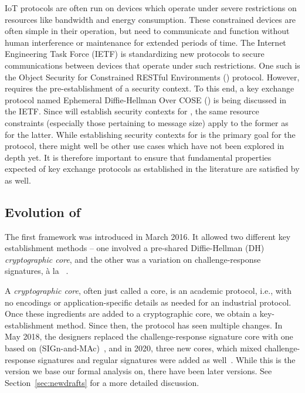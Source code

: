 IoT protocols are often run on devices which operate under severe restrictions
on resources like bandwidth and energy consumption.
%
These constrained devices are often simple in their operation, but need to
communicate and function without human interference or maintenance for
extended periods of time.
%
The Internet Engineering Task Force (IETF) is standardizing new protocols to secure communications between devices that operate under such restrictions.
%
One such is the Object Security for Constrained RESTful Environments
(\mOscore{}) protocol.
%
However, \mOscore{} requires the pre-establishment of a security context.
%
To this end, a key exchange protocol named Ephemeral Diffie-Hellman Over
COSE
(\mEdhoc{}) is being discussed in the IETF.
%
Since \mEdhoc{} will establish security contexts for \mOscore{}, the same
resource constraints (especially those pertaining to message size) apply to the
former as for the latter.
%
While establishing security contexts for \mOscore{} is the primary goal for the
\mEdhoc{} protocol, there might well be other use cases which have not been
explored in depth yet.
%
It is therefore important to ensure that fundamental properties
expected of key exchange protocols as established in the literature are satisfied
by \mEdhoc{} as well.
%

\subsection{Evolution of \mEdhoc}
\label{sec:edhocevol}
The first \mEdhoc{} framework was introduced in March 2016.
%
It allowed two different key establishment methods -- one involved a pre-shared
Diffie-Hellman (DH) \emph{cryptographic core}, and the other was a
variation on challenge-response signatures, {\`a} la
\mOptls{}~\cite{DBLP:conf/eurosp/KrawczykW16}.

%
A \emph{cryptographic core}, often just called a core, is an academic protocol,
i.e., with no encodings or application-specific details as needed for an
industrial protocol.
%
Once these ingredients are added to a cryptographic core, we obtain a
key-establishment method.
%
Since then, the protocol has seen multiple changes.
%
In May 2018, the designers replaced the challenge-response signature core with
one based on \mSigma{}
(SIGn-and-MAc)~\cite{sigma,bruni-analysis-selander-ace-cose-ecdhe-08}, and
in
2020, three new cores, which mixed challenge-response signatures and regular
signatures were added as well~\cite{our-analysis-selander-lake-edhoc-00}.
%
While this is the version we base our formal analysis on, there have been later versions. 
%
See Section~\ref{sec:newdrafts} for a more detailed discussion.

